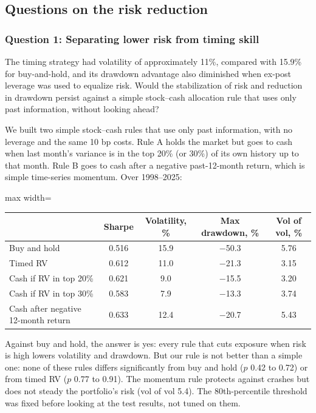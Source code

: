 \subsection{Questions on the risk reduction}

\subsubsection*{Question 1: Separating lower risk from timing skill}
\begin{question}
The timing strategy had volatility of approximately 11\%, compared with 15.9\% for buy-and-hold, and its drawdown advantage also diminished when ex-post leverage was used to equalize risk. Would the stabilization of risk and reduction in drawdown persist against a simple stock--cash allocation rule that uses only past information, without looking ahead?
\end{question}
We built two simple stock--cash rules that use only past information, with no leverage and the same 10 bp costs. Rule A holds the market but goes to cash when last month's variance is in the top 20\% (or 30\%) of its own history up to that month. Rule B goes to cash after a negative past-12-month return, which is simple time-series momentum. Over 1998--2025:
\begin{center}\small
\begin{adjustbox}{max width=\linewidth}\begin{tabular}{@{}lcccc@{}}
\toprule
 & Sharpe & Volatility, \% & Max drawdown, \% & Vol of vol, \%\\
\midrule
Buy and hold & 0.516 & 15.9 & $-$50.3 & 5.76\\
Timed RV & 0.612 & 11.0 & $-$21.3 & 3.15\\
Cash if RV in top 20\% & 0.621 & 9.0 & $-$15.5 & 3.20\\
Cash if RV in top 30\% & 0.583 & 7.9 & $-$13.3 & 3.74\\
Cash after negative 12-month return & 0.633 & 12.4 & $-$20.7 & 5.43\\
\bottomrule
\end{tabular}\end{adjustbox}
\end{center}
Against buy and hold, the answer is yes: every rule that cuts exposure when risk is high lowers volatility and drawdown. But our rule is not better than a simple one: none of these rules differs significantly from buy and hold ($p$ 0.42 to 0.72) or from timed RV ($p$ 0.77 to 0.91). The momentum rule protects against crashes but does not steady the portfolio's risk (vol of vol 5.4). The 80th-percentile threshold was fixed before looking at the test results, not tuned on them.

